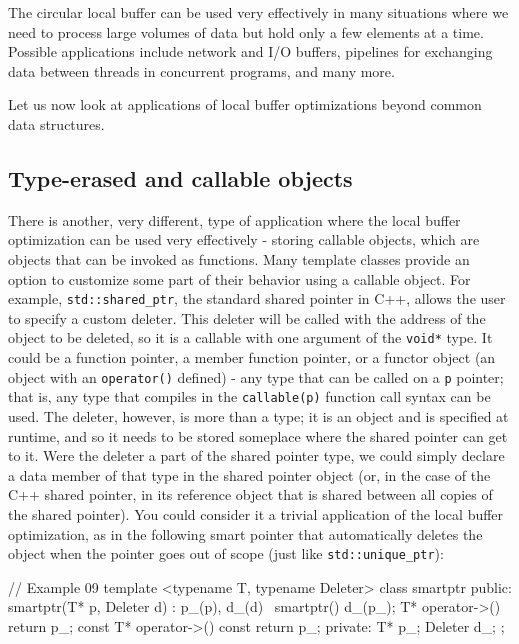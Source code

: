 The circular local buffer can be used very effectively in many situations where we need to process large volumes of data but hold only a few elements at a time. Possible applications include network and I/O buffers, pipelines for exchanging data between threads in concurrent programs, and many more.

Let us now look at applications of local buffer optimizations beyond common data structures.

\subsection{Type-erased and callable objects}

There is another, very different, type of application where the local buffer optimization can be used very effectively - storing callable objects, which are objects that can be invoked as functions. Many template classes provide an option to customize some part of their behavior using a callable object. For example, \texttt{std::shared\_ptr}, the standard shared pointer in C++, allows the user to specify a custom deleter. This deleter will be called with the address of the object to be deleted, so it is a callable with one argument of the \texttt{void*} type. It could be a function pointer, a member function pointer, or a functor object (an object with an \texttt{operator()} defined) - any type that can be called on a \texttt{p} pointer; that is, any type that compiles in the \texttt{callable(p)} function call syntax can be used. The deleter, however, is more than a type; it is an object and is specified at runtime, and so it needs to be stored someplace where the shared pointer can get to it. Were the deleter a part of the shared pointer type, we could simply declare a data member of that type in the shared pointer object (or, in the case of the C++ shared pointer, in its reference object that is shared between all copies of the shared pointer). You could consider it a trivial application of the local buffer optimization, as in the following smart pointer that automatically deletes the object when the pointer goes out of scope (just like \texttt{std::unique\_ptr}):

\begin{code}
// Example 09
template <typename T, typename Deleter> class smartptr {
  public:
  smartptr(T* p, Deleter d) : p_(p), d_(d) {}
  ~smartptr() { d_(p_); }
  T* operator->() { return p_; }
  const T* operator->() const { return p_; } private:
  T* p_;
  Deleter d_;
};
\end{code}

